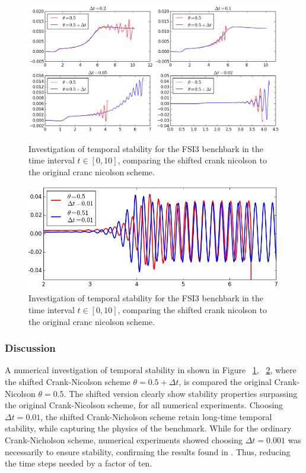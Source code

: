 \begin{figure}[h!]
 	\centering
    \includegraphics[scale=0.6]{./Fig/thetacheck.png} \\
      \caption{Investigation of temporal stability for the FSI3 benchbark in the time interval $t \in [0, 10]$, comparing the shifted crank nicolson to the original cranc nicolson scheme. }
\label{fig:cncomp1}
\end{figure}

\newpage

\begin{figure}[h!]
 	\centering
    \includegraphics[scale=0.6]{./Fig/besttheta.png}
      \caption{Investigation of temporal stability for the FSI3 benchbark in the time interval $t \in [0, 10]$, comparing the shifted crank nicolson to the original cranc nicolson scheme. }
\label{fig:cncomp2}
\end{figure}

\subsubsection*{Discussion}

A numerical investigation of temporal stability in shown in Figure ~\ref{fig:cncomp1}, ~\ref{fig:cncomp2}, where the shifted Crank-Nicolson scheme $\theta = 0.5 + \Delta t$, is compared the original Crank-Nicolson $\theta = 0.5$. The shifted version clearly show stability properties surpassing the original Crank-Nicolson  scheme, for all numerical experiments. Choosing $\Delta t = 0.01$, the shifted Crank-Nicholson scheme retain long-time temporal stability, while capturing the physics of the benchmark. While for the ordinary Crank-Nicholson scheme, numerical experiments showed choosing $\Delta t = 0.001$ was necessarily to ensure stability, confirming the results found in \cite{Wicka}. Thus, reducing the time steps needed by a factor of ten. \\


